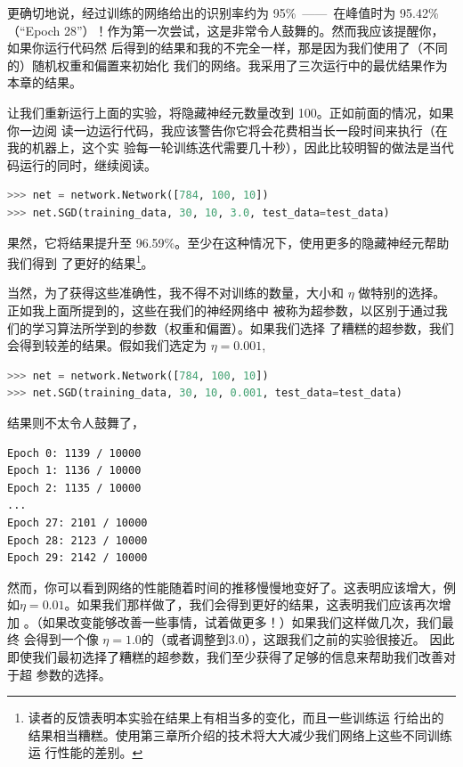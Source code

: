 更确切地说，经过训练的网络给出的识别率约为 95\%~——~在峰值时为 95.42\%（“Epoch
  28”）！作为第一次尝试，这是非常令人鼓舞的。然而我应该提醒你，如果你运行代码然
后得到的结果和我的不完全一样，那是因为我们使用了（不同的）随机权重和偏置来初始化
我们的网络。我采用了三次运行中的最优结果作为本章的结果。

让我们重新运行上面的实验，将隐藏神经元数量改到 100。正如前面的情况，如果你一边阅
读一边运行代码，我应该警告你它将会花费相当长一段时间来执行（在我的机器上，这个实
  验每一轮训练迭代需要几十秒），因此比较明智的做法是当代码运行的同时，继续阅读。

\begin{lstlisting}[language=Python]
>>> net = network.Network([784, 100, 10])
>>> net.SGD(training_data, 30, 10, 3.0, test_data=test_data)
\end{lstlisting}

果然，它将结果提升至 96.59\%。至少在这种情况下，使用更多的隐藏神经元帮助我们得到
了更好的结果\footnote{读者的反馈表明本实验在结果上有相当多的变化，而且一些训练运
  行给出的结果相当糟糕。使用第三章所介绍的技术将大大减少我们网络上这些不同训练运
  行性能的差别。}。

当然，为了获得这些准确性，我不得不对训练的\epochs{}数量，\minibatch{}大小和%
\learningrate{} $\eta$ 做特别的选择。正如我上面所提到的，这些在我们的神经网络中
被称为超参数，以区别于通过我们的学习算法所学到的参数（权重和偏置）。如果我们选择
了糟糕的超参数，我们会得到较差的结果。假如我们选定\learningrate{}为 $\eta =
0.001$,

\begin{lstlisting}[language=Python]
>>> net = network.Network([784, 100, 10])
>>> net.SGD(training_data, 30, 10, 0.001, test_data=test_data)
\end{lstlisting}

结果则不太令人鼓舞了，

\begin{lstlisting}[language=sh]
Epoch 0: 1139 / 10000
Epoch 1: 1136 / 10000
Epoch 2: 1135 / 10000
...
Epoch 27: 2101 / 10000
Epoch 28: 2123 / 10000
Epoch 29: 2142 / 10000
\end{lstlisting}

然而，你可以看到网络的性能随着时间的推移慢慢地变好了。这表明应该增大\learningrate{}，例
如$\eta = 0.01$。如果我们那样做了，我们会得到更好的结果，这表明我们应该再次增加
\learningrate{}。（如果改变能够改善一些事情，试着做更多！）如果我们这样做几次，我们最终
会得到一个像 $\eta = 1.0$的\learningrate{}（或者调整到$3.0$），这跟我们之前的实验很接近。
因此即使我们最初选择了糟糕的超参数，我们至少获得了足够的信息来帮助我们改善对于超
参数的选择。

